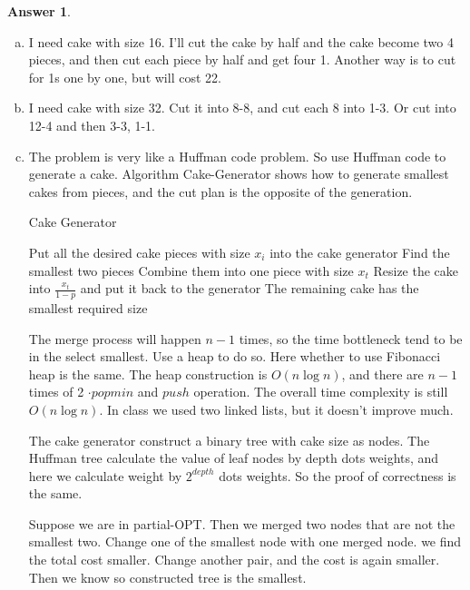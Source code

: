 \documentclass{article}
\theoremstyle{definition}
\newtheorem{ans}{Answer}
\begin{document}
	\begin{ans}
		~
		
		\begin{enumerate}[(a)]
			\item I need cake with size 16. I'll cut the cake by half and the cake become two 4 pieces, and then cut each piece by half and get four 1. Another way is to cut for 1s one by one, but will cost 22.
			\item I need cake with size 32. Cut it into 8-8, and cut each 8 into 1-3. Or cut into 12-4 and then 3-3, 1-1.
			\item The problem is very like a Huffman code problem. So use Huffman code to generate a cake. Algorithm Cake-Generator shows how to generate smallest cakes from pieces, and the cut plan is the opposite of the generation.
			
			\begin{algorithm}
				\caption{Cake Generator}
				\BlankLine
				Put all the desired cake pieces with size $x_i$ into the cake generator\;
				{
					Find the smallest two pieces\;
					Combine them into one piece with size $x_t$\;
					Resize the cake into $\frac{x_t}{1-p}$ and put it back to the generator\;
				}
				The remaining cake has the smallest required size\;
			\end{algorithm}
		
			The merge process will happen $n-1$ times, so the time bottleneck tend to be in the select smallest. Use a heap to do so. Here whether to use Fibonacci heap is the same. The heap construction is $O(n\log n)$, and there are $n-1$ times of 2 $\cdot popmin$ and $push$ operation. The overall time complexity is still $O(n\log n)$. In class we used two linked lists, but it doesn't improve much.
			
			The cake generator construct a binary tree with cake size as nodes. The Huffman tree calculate the value of leaf nodes by depth dots weights, and here we calculate weight by $2^{depth}$ dots weights. So the proof of correctness is the same.
			
			Suppose we are in partial-OPT. Then we merged two nodes that are not the smallest two. Change one of the smallest node with one merged node. we find the total cost smaller. Change another pair, and the cost is again smaller. Then we know so constructed tree is the smallest. 
		\end{enumerate}
	\end{ans}
	
\end{document}
